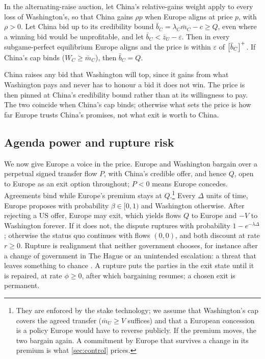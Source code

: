 \begin{remark}\label{rem:spite}
In the alternating-raise auction, let China's relative-gains weight apply to every loss of Washington's, so that China gains $\rho p$ when Europe aligns at price $p$, with $\rho>0$. Let China bid up to its credibility bound $\bar b_C=\lambda_C\bar m_C-c\ge Q$, even where a winning bid would be unprofitable, and let $\bar b_C<\bar z_U-\varepsilon$. Then in every subgame-perfect equilibrium Europe aligns and the price is within $\varepsilon$ of $\left[\bar b_C\right]^{+}$. If China's cap binds ($W_C\ge\bar m_C$), then $\bar b_C=Q$.
\end{remark}

China raises any bid that Washington will top, since it gains from what Washington pays and never has to honour a bid it does not win. The price is then pinned at China's credibility bound rather than at its willingness to pay. The two coincide when China's cap binds; otherwise what sets the price is how far Europe trusts China's promises, not what exit is worth to China.

\subsection{Agenda power and rupture risk}\label{sec:master}

We now give Europe a voice in the price. Europe and Washington bargain over a perpetual signed transfer flow $P$, with China's credible offer, and hence $Q$, open to Europe as an exit option throughout; $P<0$ means Europe concedes. Agreements bind while Europe's premium stays at $Q$.\footnote{They are enforced by the stake technology; we assume that Washington's cap covers the agreed transfer ($\bar m_U\ge V$ suffices) and that a European concession is a policy Europe would have to reverse publicly. If the premium moves, the two bargain again. A commitment by Europe that survives a change in its premium is what \cref{sec:control} prices.} Every $\Delta$ units of time, Europe proposes with probability $\beta\in[0,1)$ and Washington otherwise. After rejecting a US offer, Europe may exit, which yields flows $Q$ to Europe and $-V$ to Washington forever. If it does not, the dispute ruptures with probability $1-e^{-\lambda\Delta}$; otherwise the status quo continues with flows $(0,0)$, and both discount at rate $r\ge 0$. Rupture is realignment that neither government chooses, for instance after a change of government in The Hague or an unintended escalation: a threat that leaves something to chance \citep{schelling1960strategy}. A rupture puts the parties in the exit state until it is repaired, at rate $\phi\ge 0$, after which bargaining resumes; a chosen exit is permanent.

